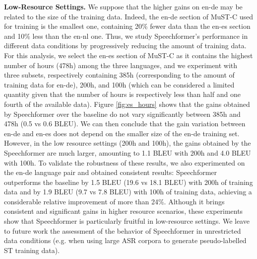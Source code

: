 \documentclass[11pt]{article}
\begin{document}
\noindent \textbf{Low-Resource Settings.}
We suppose that the higher gains on en-de may be related to the size of the training data. Indeed, the en-de section of MuST-C used for training is the smallest one,
containing 20\% fewer data than the en-es section and 10\% less than the en-nl one.
Thus, we study Speechformer's performance in different data conditions by progressively reducing the amount of training data.
For this analysis, we select the en-es section of MuST-C as it contains the highest number of hours (478h) among the three languages, and we experiment with three subsets, respectively containing 385h (corresponding to the amount of training data for en-de), 200h, and 100h (which can be considered a limited quantity given that the number of hours is respectively less than half and one fourth of the available data).
Figure \ref{fig:es_hours} shows that the gains obtained by Speechformer over the baseline do not vary significantly between 385h and 478h (0.5 vs 0.6 BLEU).
We can then conclude that the gain variation between en-de and en-es does not depend on the smaller size of the en-de training set. However, in the low resource settings (200h and 100h), the gains obtained by the Speechformer are much larger, amounting to 1.1 BLEU with 200h and 4.0 BLEU with 100h. To validate the robustness of these results, we also experimented on the en-de language pair and obtained consistent results: 
Speechformer outperforms the baseline by 1.5 BLEU (19.6 vs 18.1 BLEU) with 200h of training data and by 1.9 BLEU (9.7 vs 7.8 BLEU) with 100h of training data, achieving a considerable relative improvement of more than 24\%.
Although it brings consistent and significant gains in higher resource scenarios, these experiments show that Speechformer is particularly fruitful in low-resource settings.
We leave to future work the assessment of the behavior of Speechformer in unrestricted data conditions (e.g. when using large ASR corpora to generate pseudo-labelled ST training data).

\eshours
\end{document}
